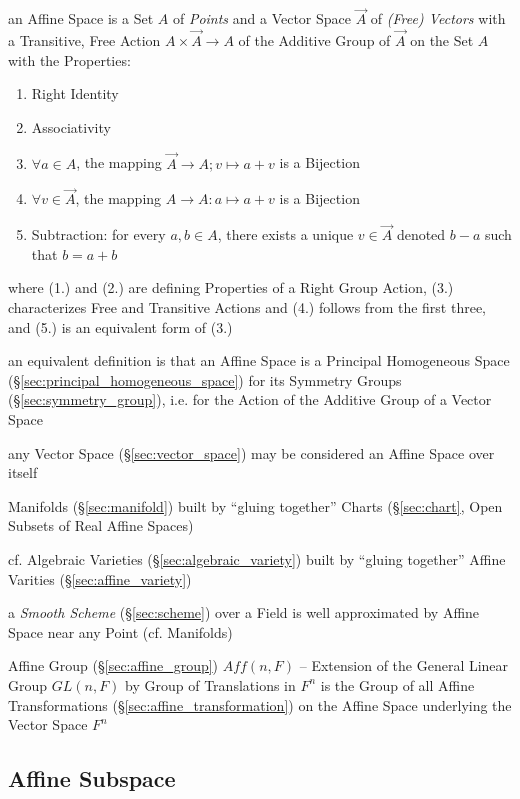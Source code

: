 an Affine Space is a Set $A$ of \emph{Points} and a Vector Space $\vec{A}$ of
\emph{(Free) Vectors} with a Transitive, Free Action
$A \times \vec{A} \rightarrow A$ of the Additive Group of $\vec{A}$ on the
Set $A$ with the Properties:
\begin{enumerate}
\item Right Identity
\item Associativity
\item $\forall a \in A$, the mapping $\vec{A} \rightarrow A; v \mapsto a + v$ is
  a Bijection
\item $\forall v \in \vec{A}$, the mapping $A \rightarrow A : a \mapsto a + v$
  is a Bijection
\item Subtraction: for every $a, b \in A$, there exists a unique $v \in \vec{A}$
  denoted $b - a$ such that $b = a + b$
\end{enumerate}
where (1.) and (2.) are defining Properties of a Right Group Action, (3.)
characterizes Free and Transitive Actions and (4.) follows from the first three,
and (5.) is an equivalent form of (3.)

an equivalent definition is that an Affine Space is a Principal Homogeneous
Space (\S\ref{sec:principal_homogeneous_space}) for its Symmetry Groups
(\S\ref{sec:symmetry_group}), i.e. for the Action of the Additive Group of a
Vector Space

any Vector Space (\S\ref{sec:vector_space}) may be considered an Affine Space
over itself

Manifolds (\S\ref{sec:manifold}) built by ``gluing together'' Charts
(\S\ref{sec:chart}, Open Subsets of Real Affine Spaces)

cf. Algebraic Varieties (\S\ref{sec:algebraic_variety}) built by ``gluing
together'' Affine Varities (\S\ref{sec:affine_variety})

\fist a \emph{Smooth Scheme} (\S\ref{sec:scheme}) over a Field is well
approximated by Affine Space near any Point (cf. Manifolds)

Affine Group (\S\ref{sec:affine_group}) $Aff(n,F)$ -- Extension of the General
Linear Group $GL(n,F)$ by Group of Translations in $F^n$ is the Group of all
Affine Transformations (\S\ref{sec:affine_transformation}) on the Affine Space
underlying the Vector Space $F^n$



\subsection{Affine Subspace}\label{sec:affine_subspace}

